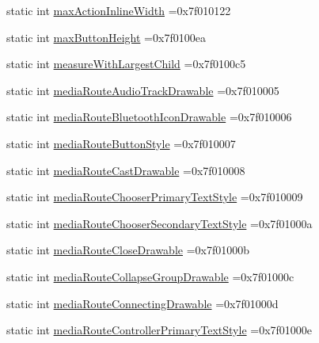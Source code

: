 \begin{DoxyCompactItemize}
\item 
static int \hyperlink{classandroid_1_1support_1_1graphics_1_1drawable_1_1R_1_1attr_a863053ef13b6235c63d7fb73887b995d}{max\+Action\+Inline\+Width} =0x7f010122
\item 
static int \hyperlink{classandroid_1_1support_1_1graphics_1_1drawable_1_1R_1_1attr_ab2420a7f7c2b02e8e9ef42ff1c549c94}{max\+Button\+Height} =0x7f0100ea
\item 
static int \hyperlink{classandroid_1_1support_1_1graphics_1_1drawable_1_1R_1_1attr_a12fba192144aac4750d57eb28a0904cb}{measure\+With\+Largest\+Child} =0x7f0100c5
\item 
static int \hyperlink{classandroid_1_1support_1_1graphics_1_1drawable_1_1R_1_1attr_a727ac607416850be2e83f53eddf77397}{media\+Route\+Audio\+Track\+Drawable} =0x7f010005
\item 
static int \hyperlink{classandroid_1_1support_1_1graphics_1_1drawable_1_1R_1_1attr_a9f026140d863f9a0450db4c2b23d5b72}{media\+Route\+Bluetooth\+Icon\+Drawable} =0x7f010006
\item 
static int \hyperlink{classandroid_1_1support_1_1graphics_1_1drawable_1_1R_1_1attr_a45fea7bb48629bab29689d1261c4cc11}{media\+Route\+Button\+Style} =0x7f010007
\item 
static int \hyperlink{classandroid_1_1support_1_1graphics_1_1drawable_1_1R_1_1attr_abed6604d2c802ebfc497d1ca6f9af435}{media\+Route\+Cast\+Drawable} =0x7f010008
\item 
static int \hyperlink{classandroid_1_1support_1_1graphics_1_1drawable_1_1R_1_1attr_af7d08769688324d1e38e65ca7d07cb19}{media\+Route\+Chooser\+Primary\+Text\+Style} =0x7f010009
\item 
static int \hyperlink{classandroid_1_1support_1_1graphics_1_1drawable_1_1R_1_1attr_ab2d5ec268218607d3169d658290ada68}{media\+Route\+Chooser\+Secondary\+Text\+Style} =0x7f01000a
\item 
static int \hyperlink{classandroid_1_1support_1_1graphics_1_1drawable_1_1R_1_1attr_ad30fb0b3b917511ac192c5e109f47311}{media\+Route\+Close\+Drawable} =0x7f01000b
\item 
static int \hyperlink{classandroid_1_1support_1_1graphics_1_1drawable_1_1R_1_1attr_a6739d8429ecee39b71ab9d9c95ea76aa}{media\+Route\+Collapse\+Group\+Drawable} =0x7f01000c
\item 
static int \hyperlink{classandroid_1_1support_1_1graphics_1_1drawable_1_1R_1_1attr_a74cc1200849f9ec848a122d1c031c190}{media\+Route\+Connecting\+Drawable} =0x7f01000d
\item 
static int \hyperlink{classandroid_1_1support_1_1graphics_1_1drawable_1_1R_1_1attr_a05cad4f1cd7d14ce2726205f073a7270}{media\+Route\+Controller\+Primary\+Text\+Style} =0x7f01000e

\end{DoxyCompactItemize}
